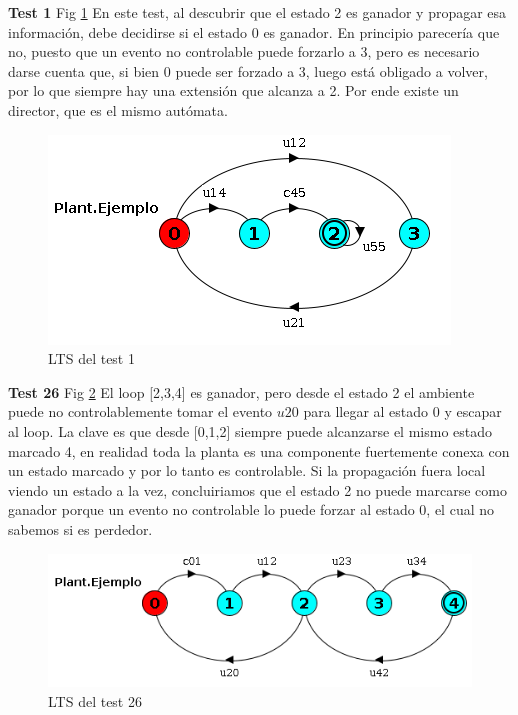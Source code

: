 \textbf{Test 1} Fig \ref{fig:test1}
En este test, al descubrir que el estado 2 es ganador y propagar esa información, debe decidirse si el estado 0 es ganador. En principio parecería que no, puesto que un evento no controlable puede forzarlo a 3, pero es necesario darse cuenta que, si bien 0 puede ser forzado a 3, luego está obligado a volver, por lo que siempre hay una extensión que alcanza a 2. Por ende existe un director, que es el mismo autómata.
\begin{figure}[h]
 \centering
 \includegraphics[scale=0.7]{figures/tests/test1.png}
 \caption{LTS del test 1}
 \label{fig:test1}
\end{figure}


\FloatBarrier
\textbf{Test 26} Fig \ref{fig:test26} 
El loop [2,3,4] es ganador, pero desde el estado 2 el ambiente puede no controlablemente tomar el evento $u20$ para llegar al estado 0 y escapar al loop. La clave es que desde [0,1,2] siempre puede alcanzarse el mismo estado marcado 4, en realidad toda la planta es una componente fuertemente conexa con un estado marcado y por lo tanto es controlable. 
Si la propagación fuera local viendo un estado a la vez, concluiriamos que el estado 2 no puede marcarse como ganador porque un evento no controlable lo puede forzar al estado 0, el cual no sabemos si es perdedor.

\begin{figure}[h]
 \centering
 \includegraphics[scale=0.7]{figures/tests/test26.png}
 \caption{LTS del test 26}
 \label{fig:test26}
\end{figure}

